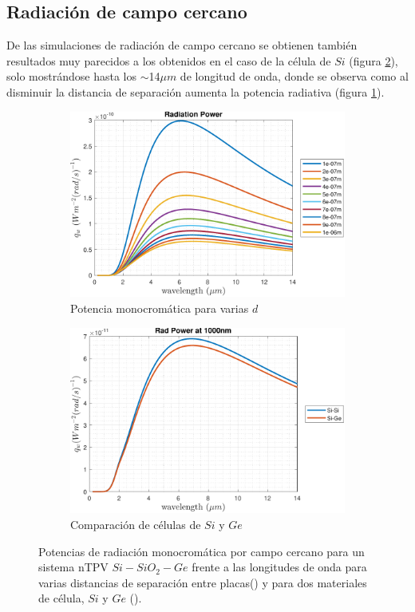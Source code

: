 \subsection{Radiación de campo cercano}
De las simulaciones de radiación de campo cercano se obtienen también resultados muy parecidos a los obtenidos en el caso de la célula de $Si$ (figura \ref{fig:SiSi_vs_SiGe}), solo mostrándose hasta los $\sim$14$\mu m$ de longitud de onda, donde se observa como al disminuir la distancia de separación aumenta la potencia radiativa (figura \ref{fig:rad_SiGe}).
\begin{figure}[H]
\centering
\begin{subfigure}[b]{0.49\textwidth}
	\centering
		\includegraphics[width=1.00\textwidth]{figuras/Resultados/radiacion/SiGe.pdf}
	\caption{Potencia monocromática para varias $d$}
	\label{fig:rad_SiGe}
\end{subfigure}
\hfill
\begin{subfigure}[b]{0.49\textwidth}
	\centering
		\includegraphics[width=1.00\textwidth]{figuras/Resultados/radiacion/SiSi_vs_SiGe.pdf}
	\caption{Comparación de células de $Si$ y $Ge$}
	\label{fig:SiSi_vs_SiGe}
\end{subfigure}
\caption{Potencias de radiación monocromática por campo cercano para un sistema nTPV $Si-SiO_2-Ge$ frente a las longitudes de onda para varias distancias de separación entre placas() y para dos materiales de célula, $Si$ y $Ge$ ().}
\label{fig:rads_SiGe}
\end{figure}
